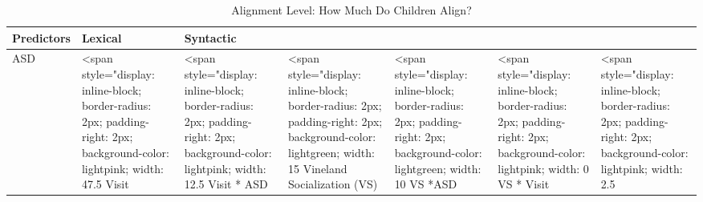 \documentclass[article,30pt,extrafontsizes]{memoir}
\begin{document}
\begin{adjmulticols*}{3}{}{}
\begin{table}
\caption{\label{tab:table2}Alignment Level: How Much Do Children Align?}
\centering
\begin{tabular}[t]{l|l|l}
\hline
Predictors & Lexical & Syntactic\\
\hline
ASD & <span style="display: inline-block; border-radius: 2px; padding-right: 2px; background-color: lightpink; width: 47.5%
\hline
Visit & <span style="display: inline-block; border-radius: 2px; padding-right: 2px; background-color: lightpink; width: 12.5%
\hline
Visit * ASD & <span style="display: inline-block; border-radius: 2px; padding-right: 2px; background-color: lightgreen; width: 15%
\hline
Vineland Socialization (VS) & <span style="display: inline-block; border-radius: 2px; padding-right: 2px; background-color: lightgreen; width: 10%
\hline
VS *ASD & <span style="display: inline-block; border-radius: 2px; padding-right: 2px; background-color: lightpink; width: 0%
\hline
VS * Visit & <span style="display: inline-block; border-radius: 2px; padding-right: 2px; background-color: lightpink; width: 2.5%

\end{tabular}
\end{table}
\end{adjmulticols*}
\end{document}
